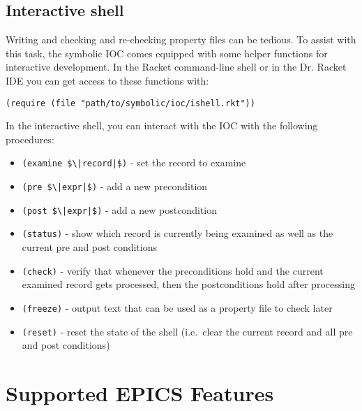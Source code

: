 \documentclass[10pt]{article}
\def\|#1|{\mathid{#1}}
\newcommand{\mathid}[1]{\ensuremath{\mathit{#1}}}
\begin{document}
\subsection{Interactive shell}

Writing and checking and re-checking property files can be tedious. To assist
with this task, the symbolic IOC comes equipped with some helper functions for
interactive development. In the Racket command-line shell or in the Dr. Racket
IDE you can get access to these functions with:
%
\begin{lstlisting}[language=Rosette]
    (require (file "path/to/symbolic/ioc/ishell.rkt"))
\end{lstlisting}
%
In the interactive shell, you can interact with the IOC with the following
procedures:
\begin{itemize}
  \item \lstinline[mathescape]{(examine $\|record|$)} - set the record to examine
  \item \lstinline[mathescape]{(pre $\|expr|$)} - add a new precondition
  \item \lstinline[mathescape]{(post $\|expr|$)} - add a new postcondition
  \item \lstinline{(status)} - show which record is currently being examined as well as the current pre and post conditions
  \item \lstinline{(check)} - verify that whenever the preconditions hold and the current examined record gets processed, then the postconditions hold after processing
  \item \lstinline{(freeze)} - output text that can be used as a property file to check later
  \item \lstinline{(reset)} - reset the state of the shell (i.e.\ clear the current record and all pre and post conditions)
\end{itemize}
%



\section{Supported EPICS Features}
\end{document}
